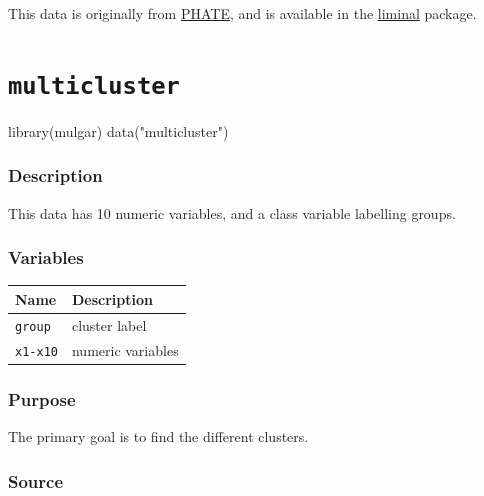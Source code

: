 \documentclass[
  letterpaper,
]{krantz}
\newenvironment{Shaded}{\begin{snugshade}}{\end{snugshade}}
\newcommand{\FunctionTok}[1]{\textcolor[rgb]{0.28,0.35,0.67}{#1}}
\newcommand{\NormalTok}[1]{\textcolor[rgb]{0.00,0.23,0.31}{#1}}
\newcommand{\StringTok}[1]{\textcolor[rgb]{0.13,0.47,0.30}{#1}}
\newcounter{none} %
\begin{document}
This data is originally from
\href{https://github.com/KrishnaswamyLab/PHATE}{PHATE}, and is available
in the \href{https://sa-lee.github.io/liminal/}{liminal} package.

\section{\texorpdfstring{\texttt{multicluster}}{multicluster}}\label{multicluster}

\begin{Shaded}
\begin{Highlighting}[]
\FunctionTok{library}\NormalTok{(mulgar)}
\FunctionTok{data}\NormalTok{(}\StringTok{"multicluster"}\NormalTok{)}
\end{Highlighting}
\end{Shaded}

\subsubsection*{Description}\label{description-7}

This data has 10 numeric variables, and a class variable labelling
groups.

\subsubsection*{Variables}\label{variables-7}

{\def\LTcaptype{none} %
\begin{longtable}[]{@{}ll@{}}
\toprule\noalign{}
Name & Description \\
\midrule\noalign{}
\endhead
\bottomrule\noalign{}
\endlastfoot
\texttt{group} & cluster label \\
\texttt{x1-x10} & numeric variables \\
\end{longtable}
}

\subsubsection*{Purpose}\label{purpose-7}

The primary goal is to find the different clusters.

\subsubsection*{Source}\label{source-7}
\end{document}
